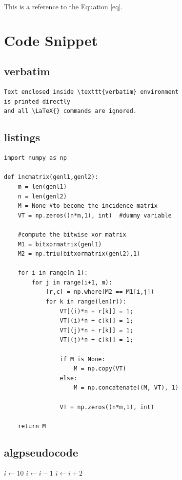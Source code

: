 \documentclass[a4paper, oneside]{book}
\begin{document}
This is a reference to the Equation \ref{eq}.

\section{Code Snippet}

\subsection{verbatim}
\begin{verbatim}
Text enclosed inside \texttt{verbatim} environment 
is printed directly 
and all \LaTeX{} commands are ignored.
\end{verbatim}

\subsection{listings}
\begin{lstlisting}
import numpy as np
    
def incmatrix(genl1,genl2):
    m = len(genl1)
    n = len(genl2)
    M = None #to become the incidence matrix
    VT = np.zeros((n*m,1), int)  #dummy variable
    
    #compute the bitwise xor matrix
    M1 = bitxormatrix(genl1)
    M2 = np.triu(bitxormatrix(genl2),1) 

    for i in range(m-1):
        for j in range(i+1, m):
            [r,c] = np.where(M2 == M1[i,j])
            for k in range(len(r)):
                VT[(i)*n + r[k]] = 1;
                VT[(i)*n + c[k]] = 1;
                VT[(j)*n + r[k]] = 1;
                VT[(j)*n + c[k]] = 1;
                
                if M is None:
                    M = np.copy(VT)
                else:
                    M = np.concatenate((M, VT), 1)
                
                VT = np.zeros((n*m,1), int)
    
    return M
\end{lstlisting}

\subsection{algpseudocode}
\begin{algorithmic}
\State $i \gets 10$
    \State $i \gets i-1$
\Else
        \State $i \gets i+2$
    \EndIf
\EndIf 
\end{algorithmic}
\end{document}
